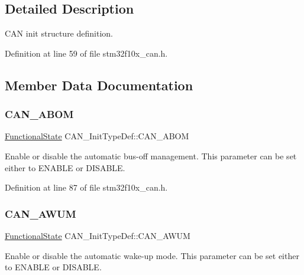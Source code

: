 \subsection{Detailed Description}
C\+AN init structure definition. 

Definition at line 59 of file stm32f10x\+\_\+can.\+h.



\subsection{Member Data Documentation}
\mbox{\label{struct_c_a_n___init_type_def_a70560646c27d96ca8adc4a62d24dafd9}} 
\subsubsection{\texorpdfstring{C\+A\+N\+\_\+\+A\+B\+OM}{CAN\_ABOM}}
{\footnotesize\ttfamily \hyperlink{group___exported__types_gac9a7e9a35d2513ec15c3b537aaa4fba1}{Functional\+State} C\+A\+N\+\_\+\+Init\+Type\+Def\+::\+C\+A\+N\+\_\+\+A\+B\+OM}

Enable or disable the automatic bus-\/off management. This parameter can be set either to E\+N\+A\+B\+LE or D\+I\+S\+A\+B\+LE. 

Definition at line 87 of file stm32f10x\+\_\+can.\+h.

\mbox{\label{struct_c_a_n___init_type_def_a10f873c858a7b0efc2d0ab41524320d3}} 
\subsubsection{\texorpdfstring{C\+A\+N\+\_\+\+A\+W\+UM}{CAN\_AWUM}}
{\footnotesize\ttfamily \hyperlink{group___exported__types_gac9a7e9a35d2513ec15c3b537aaa4fba1}{Functional\+State} C\+A\+N\+\_\+\+Init\+Type\+Def\+::\+C\+A\+N\+\_\+\+A\+W\+UM}

Enable or disable the automatic wake-\/up mode. This parameter can be set either to E\+N\+A\+B\+LE or D\+I\+S\+A\+B\+LE. 

